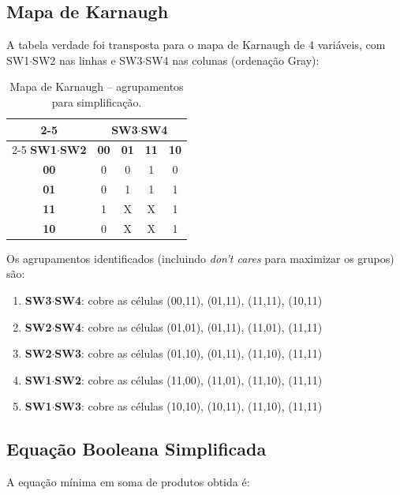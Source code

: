 \documentclass[12pt,a4paper, brazil]{article}
\begin{document}
\subsection{Mapa de Karnaugh}

A tabela verdade foi transposta para o mapa de Karnaugh de 4 variáveis, com SW1$\cdot$SW2 nas linhas e SW3$\cdot$SW4 nas colunas (ordenação Gray):

\begin{table}[H]
\centering
\caption{Mapa de Karnaugh -- agrupamentos para simplificação.}
\label{tab:karnaugh}
\begin{tabular}{c|c|c|c|c|}
\cline{2-5}
 & \multicolumn{4}{c|}{\textbf{SW3$\cdot$SW4}} \\
\cline{2-5}
\textbf{SW1$\cdot$SW2} & \textbf{00} & \textbf{01} & \textbf{11} & \textbf{10} \\
\hline
\multicolumn{1}{|c|}{\textbf{00}} & 0 & 0 & 1 & 0 \\
\hline
\multicolumn{1}{|c|}{\textbf{01}} & 0 & 1 & 1 & 1 \\
\hline
\multicolumn{1}{|c|}{\textbf{11}} & 1 & X & X & 1 \\
\hline
\multicolumn{1}{|c|}{\textbf{10}} & 0 & X & X & 1 \\
\hline
\end{tabular}
\end{table}

Os agrupamentos identificados (incluindo \textit{don't cares} para maximizar os grupos) são:

\begin{enumerate}
    \item \textbf{SW3$\cdot$SW4}: cobre as células (00,11), (01,11), (11,11), (10,11)
    \item \textbf{SW2$\cdot$SW4}: cobre as células (01,01), (01,11), (11,01), (11,11)
    \item \textbf{SW2$\cdot$SW3}: cobre as células (01,10), (01,11), (11,10), (11,11)
    \item \textbf{SW1$\cdot$SW2}: cobre as células (11,00), (11,01), (11,10), (11,11)
    \item \textbf{SW1$\cdot$SW3}: cobre as células (10,10), (10,11), (11,10), (11,11)
\end{enumerate}

\subsection{Equação Booleana Simplificada}

A equação mínima em soma de produtos obtida é:
\end{document}
